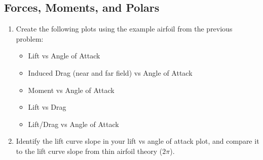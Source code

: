 \documentclass[11pt,twocolumn]{article}
\begin{document}
\subsection{Forces, Moments, and Polars}

\begin{enumerate}[label=\roman*.]
	\item Create the following plots using the example airfoil from the previous problem:
	\begin{itemize}
		\item Lift vs Angle of Attack
		\item Induced Drag (near and far field) vs Angle of Attack
		\item Moment vs Angle of Attack
		\item Lift vs Drag
		\item Lift/Drag vs Angle of Attack
	\end{itemize}
	\item Identify the lift curve slope in your lift vs angle of attack plot, and compare it to the lift curve slope from thin airfoil theory (\(2\pi\)).
\end{enumerate}
\end{document}
